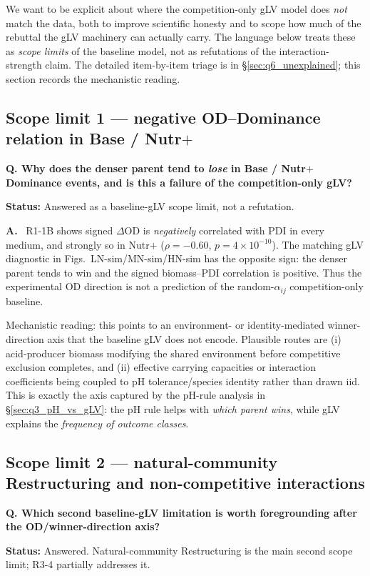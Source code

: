 \documentclass[11pt]{article}
\newcommand{\question}[1]{%
    \par\vspace{0.4em}\noindent%
    {\color{blue!70!black}\textbf{Q. #1}}\par\smallskip%
}
\newcommand{\answerlabel}{\par\noindent\textbf{A.}\ }
\newcommand{\statusmark}[1]{{\color{red!70!black}\textbf{Status:} #1}\par}
\begin{document}
We want to be explicit about where the competition-only gLV model does \emph{not} match the data, both to improve scientific honesty and to scope how much of the rebuttal the gLV machinery can actually carry. The language below treats these as \emph{scope limits} of the baseline model, not as refutations of the interaction-strength claim. The detailed item-by-item triage is in \S\ref{sec:q6_unexplained}; this section records the mechanistic reading.

\subsection{Scope limit 1 --- negative OD--Dominance relation in Base / Nutr$+$}
\label{sec:q2_failure_1}

\question{Why does the denser parent tend to \emph{lose} in Base / Nutr$+$ Dominance events, and is this a failure of the competition-only gLV?}
\statusmark{Answered as a baseline-gLV scope limit, not a refutation.}

\answerlabel
R1-1B shows signed $\Delta$OD is \emph{negatively} correlated with PDI in every medium, and strongly so in Nutr$+$ ($\rho = -0.60$, $p = 4 \times 10^{-10}$). The matching gLV diagnostic in Figs.~LN-sim/MN-sim/HN-sim has the opposite sign: the denser parent tends to win and the signed biomass--PDI correlation is positive. Thus the experimental OD direction is not a prediction of the random-$\alpha_{ij}$ competition-only baseline.

Mechanistic reading: this points to an environment- or identity-mediated winner-direction axis that the baseline gLV does not encode. Plausible routes are (i) acid-producer biomass modifying the shared environment before competitive exclusion completes, and (ii) effective carrying capacities or interaction coefficients being coupled to pH tolerance/species identity rather than drawn iid. This is exactly the axis captured by the pH-rule analysis in \S\ref{sec:q3_pH_vs_gLV}: the pH rule helps with \emph{which parent wins}, while gLV explains the \emph{frequency of outcome classes}.

\subsection{Scope limit 2 --- natural-community Restructuring and non-competitive interactions}
\label{sec:q2_failure_2}

\question{Which second baseline-gLV limitation is worth foregrounding after the OD/winner-direction axis?}
\statusmark{Answered. Natural-community Restructuring is the main second scope limit; R3-4 partially addresses it.}
\end{document}
